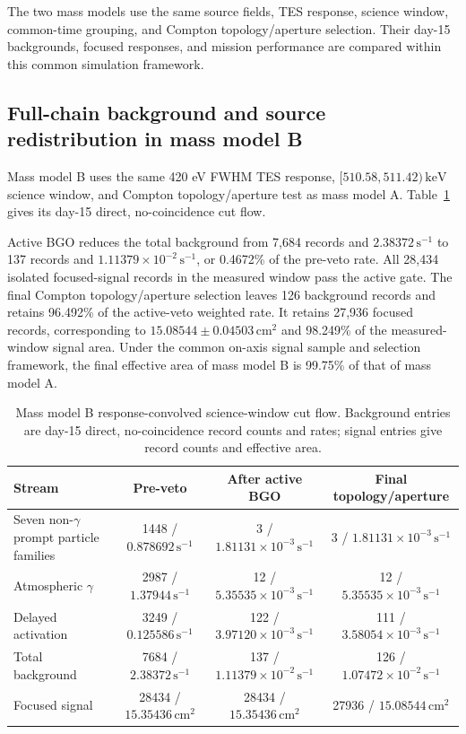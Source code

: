 \documentclass[11pt]{article}
\newcommand{\revblue}[1]{\textcolor{revisionblue}{#1}}
\newcommand{\keV}{\ensuremath{\,\mathrm{keV}}}
\newcommand{\cps}{\ensuremath{\,\mathrm{s^{-1}}}}
\begin{document}
\revblue{The two mass models use the same source fields, TES response, science window, common-time grouping, and Compton topology/aperture selection. Their day-15 backgrounds, focused responses, and mission performance are compared within this common simulation framework.}

\FloatBarrier

\subsection{Full-chain background and source redistribution in mass model B}
\label{subsec:optimized_fullchain}

Mass model B uses the same 420 eV FWHM TES response, $[510.58,511.42)\keV$ science window, and Compton topology/aperture test as mass model A. Table~\ref{tab:optimized_cutflow} gives its day-15 direct, no-coincidence cut flow.

Active BGO reduces the total background from 7,684 records and $2.38372\cps$ to 137 records and $1.11379\times10^{-2}\cps$, or 0.4672\% of the pre-veto rate. All 28,434 isolated focused-signal records in the measured window pass the active gate. The final Compton topology/aperture selection leaves 126 background records and retains 96.492\% of the active-veto weighted rate. It retains 27,936 focused records, corresponding to $15.08544\pm0.04503\,\mathrm{cm^2}$ and 98.249\% of the measured-window signal area. \revblue{Under the common on-axis signal sample and selection framework, the final effective area of mass model B is 99.75\% of that of mass model A.}

\begin{table}[H]
\centering
\caption{Mass model B response-convolved science-window cut flow. Background entries are day-15 direct, no-coincidence record counts and rates; signal entries give record counts and effective area.}
\label{tab:optimized_cutflow}
\footnotesize
\begin{tabular}{lccc}
\toprule
Stream & Pre-veto & After active BGO & Final topology/aperture \\
\midrule
\revblue{Seven non-$\gamma$ prompt particle families} & 1448 / $0.878692\cps$ & 3 / $1.81131\times10^{-3}\cps$ & 3 / $1.81131\times10^{-3}\cps$ \\
\revblue{Atmospheric $\gamma$} & 2987 / $1.37944\cps$ & 12 / $5.35535\times10^{-3}\cps$ & 12 / $5.35535\times10^{-3}\cps$ \\
Delayed activation & 3249 / $0.125586\cps$ & 122 / $3.97120\times10^{-3}\cps$ & 111 / $3.58054\times10^{-3}\cps$ \\
Total background & 7684 / $2.38372\cps$ & 137 / $1.11379\times10^{-2}\cps$ & 126 / $1.07472\times10^{-2}\cps$ \\
Focused signal & 28434 / $15.35436\,\mathrm{cm^2}$ & 28434 / $15.35436\,\mathrm{cm^2}$ & 27936 / $15.08544\,\mathrm{cm^2}$ \\
\bottomrule
\end{tabular}
\end{table}
\end{document}
